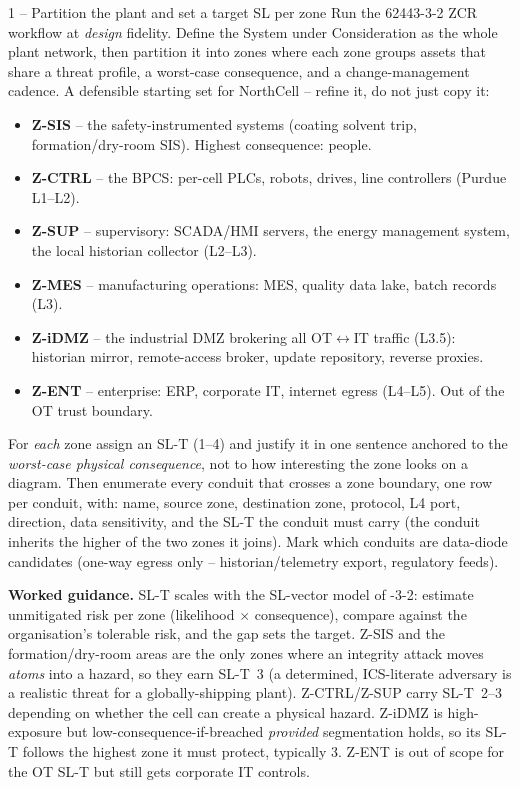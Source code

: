 \documentclass[11pt,a4paper]{article}
\begin{document}
\begin{stepbox}{1 -- Partition the plant and set a target SL per zone}
Run the 62443-3-2 ZCR workflow at \emph{design} fidelity. Define the
System under Consideration as the whole plant network, then partition it
into zones where each zone groups assets that share a threat profile,
a worst-case consequence, and a change-management cadence. A defensible
starting set for NorthCell -- refine it, do not just copy it:
\begin{itemize}\setlength{\itemsep}{1pt}
  \item \textbf{Z-SIS} -- the safety-instrumented systems (coating
    solvent trip, formation/dry-room SIS). Highest consequence: people.
  \item \textbf{Z-CTRL} -- the BPCS: per-cell PLCs, robots, drives,
    line controllers (Purdue L1--L2).
  \item \textbf{Z-SUP} -- supervisory: SCADA/HMI servers, the energy
    management system, the local historian collector (L2--L3).
  \item \textbf{Z-MES} -- manufacturing operations: MES, quality data
    lake, batch records (L3).
  \item \textbf{Z-iDMZ} -- the industrial DMZ brokering all OT$\leftrightarrow$IT
    traffic (L3.5): historian mirror, remote-access broker, update
    repository, reverse proxies.
  \item \textbf{Z-ENT} -- enterprise: ERP, corporate IT, internet
    egress (L4--L5). Out of the OT trust boundary.
\end{itemize}
For \emph{each} zone assign an SL-T (1--4) and justify it in one
sentence anchored to the \emph{worst-case physical consequence}, not to
how interesting the zone looks on a diagram. Then enumerate every
conduit that crosses a zone boundary, one row per conduit, with: name,
source zone, destination zone, protocol, L4 port, direction, data
sensitivity, and the SL-T the conduit must carry (the conduit inherits
the higher of the two zones it joins). Mark which conduits are
data-diode candidates (one-way egress only -- historian/telemetry
export, regulatory feeds).

\medskip
\noindent\textbf{Worked guidance.} SL-T scales with the SL-vector model
of -3-2: estimate unmitigated risk per zone (likelihood $\times$
consequence), compare against the organisation's tolerable risk, and the
gap sets the target. Z-SIS and the formation/dry-room areas are the only
zones where an integrity attack moves \emph{atoms} into a hazard, so they
earn SL-T~3 (a determined, ICS-literate adversary is a realistic threat
for a globally-shipping plant). Z-CTRL/Z-SUP carry SL-T~2--3 depending
on whether the cell can create a physical hazard. Z-iDMZ is high-exposure
but low-consequence-if-breached \emph{provided} segmentation holds, so its
SL-T follows the highest zone it must protect, typically 3. Z-ENT is out
of scope for the OT SL-T but still gets corporate IT controls.
\end{stepbox}
\end{document}
